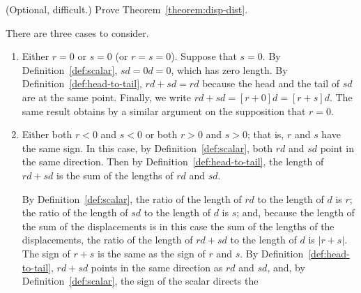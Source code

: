 \begin{exercise}
   (Optional, difficult.) Prove Theorem~\ref{theorem:disp-dist}.
   \begin{solution}
      There are three cases to consider.
      \begin{enumerate}
         \item Either $r = 0$ or $s = 0$ (or $r = s = 0$). Suppose that $s =
            0$. By Definition~\ref{def:scalar}, $s d = 0 d = 0$, which has zero
            length. By Definition~\ref{def:head-to-tail}, $r d + s d = r d$
            because the head and the tail of $s d$ are at the same point.
            Finally, we write $r d + s d = [r + 0] d = [r + s] d$. The same
            result obtains by a similar argument on the supposition that $r =
            0$.
         \item Either both $r < 0$ and $s < 0$ or both $r > 0$ and $s > 0$;
            that is, $r$ and $s$ have the same sign. In this case, by
            Definition~\ref{def:scalar}, both $r d$ and $s d$ point in the same
            direction. Then by Definition~\ref{def:head-to-tail}, the length of
            $r d + s d$ is the sum of the lengths of $r d$ and $s d$.
            \begin{center}
            \end{center}
            By Definition~\ref{def:scalar}, the ratio of the length of $r d$ to
            the length of $d$ is $r$; the ratio of the length of $s d$ to the
            length of $d$ is $s$; and, because the length of the sum of the
            displacements is in this case the sum of the lengths of the
            displacements, the ratio of the length of $r d + s d$ to the length
            of $d$ is $|r + s|$.  The sign of $r + s$ is the same as the sign
            of $r$ and $s$. By Definition~\ref{def:head-to-tail}, $r d + s d$
            points in the same direction as $r d$ and $s d$, and, by
            Definition~\ref{def:scalar}, the sign of the scalar directs the

\end{enumerate}
\end{solution}
\end{exercise}
